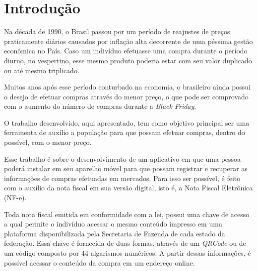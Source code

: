 \chapter{Introdução}


Na década de 1990, o Brasil passou por um período de reajustes de preços praticamente diários causados por inflação alta decorrente de uma péssima gestão econômica no País. Caso um indivíduo efetuasse uma compra durante o período diurno, no vespertino, esse mesmo produto poderia estar com seu valor duplicado ou até mesmo triplicado.

Muitos anos após esse período conturbado na economia, o brasileiro ainda possui o desejo de efetuar compras através do menor preço, o que pode ser comprovado com o aumento do número de compras durante a \textit{Black Friday}.


O trabalho desenvolvido, aqui apresentado, tem como objetivo principal ser uma ferramenta de auxílio a população para que possam efetuar compras, dentro do possível, com o menor preço.


Esse trabalho é sobre o desenvolvimento de um aplicativo em que uma pessoa poderá instalar em seu aparelho móvel para que possam registrar e recuperar as informações de compras efetuadas em mercados. Para isso ser possível, é feito com o auxílio da nota fiscal em sua versão digital, isto é, a Nota Fiscal Eletrônica (NF-e).

Toda nota fiscal emitida em conformidade com a lei, possui uma chave de acesso a qual permite o indivíduo acessar o mesmo conteúdo impresso em uma plataforma disponibilizada pela Secretaria de Fazenda de cada estado da federação. Essa chave é fornecida de duas formas, através de um \textit{QRCode} ou de um código composto por 44 algarismos numéricos. A partir dessas informações, é possível acessar o conteúdo da compra em um endereço online.

